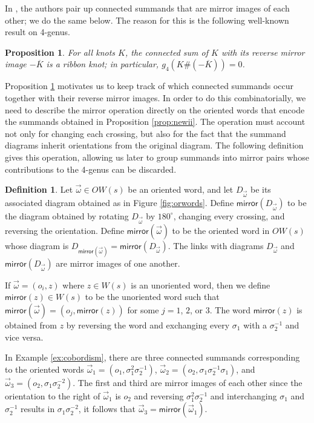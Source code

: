 \documentclass[12pt]{amsart}
\newtheorem{proposition}[theorem]{Proposition}
\theoremstyle{definition}
\newtheorem{definition}[theorem]{Definition}
\theoremstyle{remark}
\numberwithin{equation}{section}
\newcommand{\mirror}{\textsf{mirror}}
\begin{document}
In \cite[Lemma 2 (i)]{BKLMR}, the authors pair up connected summands that are mirror images of each other; we do the same below.  The reason for this is the following well-known result on 4-genus.

\begin{proposition}
\label{prop:iconnectsummirror}
For all knots $K$, the connected sum of $K$ with its reverse mirror image $-\overline{K}$ is a ribbon knot; in particular, $g_4(K\#(-\overline{K}))=0$.
\end{proposition}

Proposition \ref{prop:iconnectsummirror} motivates us to keep track of which connected summands occur together with their reverse mirror images. In order to do this combinatorially, we need to describe the mirror operation directly on the oriented words that encode the summands obtained in Proposition \ref{prop:newii}. The operation must account not only for changing each crossing, but also for the fact that the summand diagrams inherit orientations from the original diagram. The following definition gives this operation, allowing us later to group summands into mirror pairs whose contributions to the 4-genus can be discarded.

\begin{definition}
\label{def:mirror}
Let $\vec{\omega}\in OW(s)$ be an oriented word, and let $D_{\vec{\omega}}$ be its associated diagram obtained as in Figure \ref{fig:orwords}. Define $\mirror(D_{\vec{\omega}})$ to be the diagram obtained by rotating $D_{\vec{\omega}}$ by $180^\circ$, changing every crossing, and reversing the orientation. Define $\mirror(\vec{\omega})$ to be the oriented word in $OW(s)$ whose diagram is $D_{\mirror(\vec{\omega})}=\mirror(D_{\vec{\omega}})$. The links with diagrams $D_{\vec{\omega}}$ and $\mirror(D_{\vec{\omega}})$ are mirror images of one another.

If $\vec{\omega} = (o_i,z)$ where $z \in W(s)$ is an unoriented word, then we define $\mirror(z) \in W(s)$ to be the unoriented word such that $\mirror(\vec{\omega}) = (o_j,\mirror(z))$ for some $j=1$, $2$, or $3$. The word $\mirror(z)$ is obtained from $z$ by reversing the word and exchanging every $\sigma_1$ with a $\sigma_2^{-1}$ and vice versa.
\end{definition}

In Example \ref{ex:cobordism}, there are three connected summands corresponding to the oriented words $\vec{\omega}_1=(o_1,\sigma_1^2\sigma_2^{-1})$, $\vec{\omega}_2=(o_2,\sigma_1\sigma_2^{-1}\sigma_1)$, and $\vec{\omega}_3=(o_2,\sigma_1\sigma_2^{-2})$.  The first and third are mirror images of each other since the orientation to the right of $\vec{\omega}_1$ is $o_2$ and reversing $\sigma_1^2\sigma_2^{-1}$ and interchanging $\sigma_1$ and $\sigma_2^{-1}$  results in $\sigma_1\sigma_2^{-2}$, it follows that $\vec{\omega}_3=\mirror(\vec{\omega}_1)$.
\end{document}
